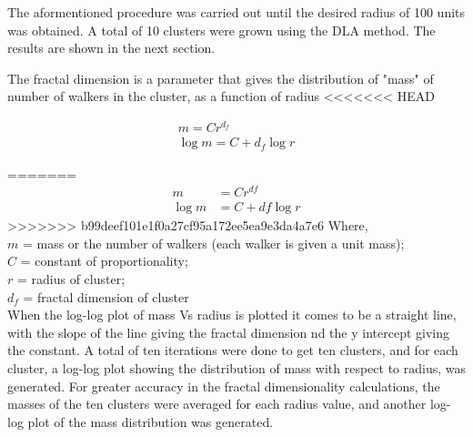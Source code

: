 \documentclass[a4paper,12pt]{article}
\begin{document}
\indent The aformentioned procedure was carried out until the desired radius of 100 units was obtained.  A total of 10 clusters were grown using the DLA method.  The
results are shown in the next section.


\indent The fractal dimension is a parameter that gives the distribution of "mass" of number of walkers in the cluster, as a function of radius
<<<<<<< HEAD

\begin{eqnarray}	
	m = C r^{d_f} \\
	\log{m} = C + d_f\log{r}
\end{eqnarray}\label{fractal dimension}


=======
\begin{align}
m &= C r^{df} \\
\log{m} &= C + df\log{r}
\label{fractal dimension}
\end{align}
>>>>>>> b99deef101e1f0a27cf95a172ee5ea9e3da4a7e6
Where, \\
$m$ = mass or the number of walkers (each walker is given a unit mass);\\
$C$ = constant of proportionality; \\
$r$ = radius of cluster; \\
$d_f$ = fractal dimension of cluster \\

\indent When the log-log plot of mass Vs radius is plotted it comes to be a straight line, with the slope of the line giving the fractal dimension nd the y intercept giving the constant. 
A total of ten iterations were done to get ten clusters, and for each cluster, a log-log plot showing the distribution of mass with respect to radius, was generated. For greater accuracy in the fractal dimensionality
calculations, the masses of the ten clusters were averaged for each radius value, and another log-log plot of the mass distribution was generated.
\end{document}
